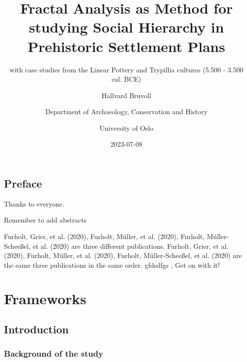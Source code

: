 \documentclass[
  12pt,
]{book}
\title{Fractal Analysis as Method for studying Social Hierarchy in Prehistoric Settlement Plans}
\subtitle{with case studies from the Linear Pottery and Trypillia cultures (5.500 - 3.500 cal. BCE)}
\author{Hallvard Bruvoll \and Department of Archaeology, Conservation and History \and University of Oslo}
\date{2023-07-08}
\begin{document}
\maketitle

{
\setcounter{tocdepth}{1}
\tableofcontents
}
\hypertarget{preface}{%
\chapter*{Preface}\label{preface}}

Thanks to everyone.

Remember to add abstracts

Furholt, Grier, et al. (2020), Furholt, Müller, et al. (2020), Furholt, Müller-Scheeßel, et al. (2020) are three different publications. Furholt, Grier, et al. (2020), Furholt, Müller, et al. (2020), Furholt, Müller-Scheeßel, et al. (2020) are the same three publications in the same order. gfdsdfgs , Get on with it!

\hypertarget{part-frameworks}{%
\part{Frameworks}\label{part-frameworks}}

\hypertarget{intro}{%
\chapter{Introduction}\label{intro}}

\hypertarget{background-of-the-study}{%
\section{Background of the study}\label{background-of-the-study}}
\end{document}
